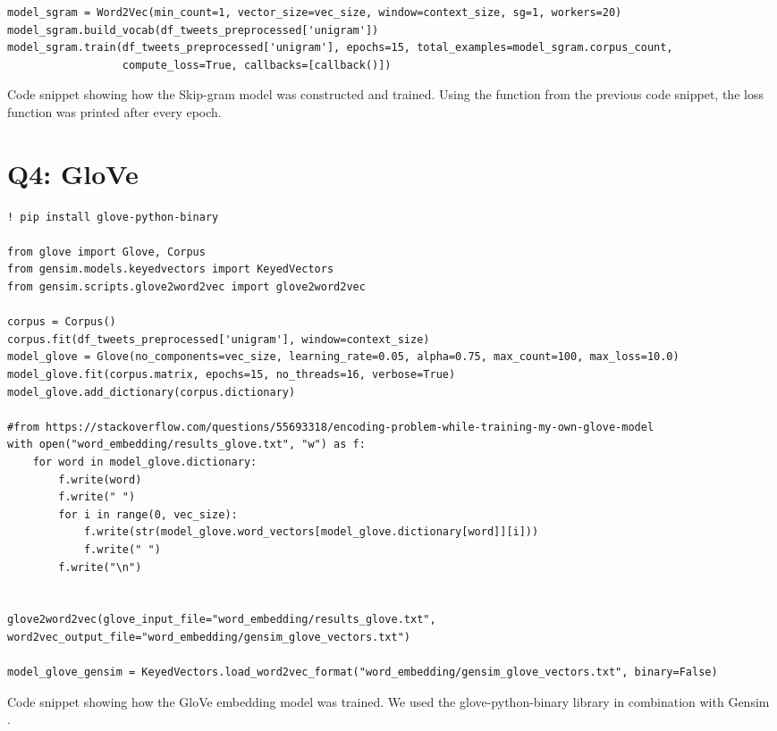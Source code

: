 \begin{listing*}
\begin{verbatim}
model_sgram = Word2Vec(min_count=1, vector_size=vec_size, window=context_size, sg=1, workers=20)
model_sgram.build_vocab(df_tweets_preprocessed['unigram'])
model_sgram.train(df_tweets_preprocessed['unigram'], epochs=15, total_examples=model_sgram.corpus_count,
                  compute_loss=True, callbacks=[callback()])
\end{verbatim}
\caption{Code snippet showing how the Skip-gram model was constructed and trained. Using the function from the previous code snippet, the loss function was printed after every epoch.}
\label{listing:p2-sgram}
\end{listing*}


\section*{Q4: GloVe}
\begin{listing*}
\begin{verbatim}
! pip install glove-python-binary

from glove import Glove, Corpus
from gensim.models.keyedvectors import KeyedVectors
from gensim.scripts.glove2word2vec import glove2word2vec

corpus = Corpus() 
corpus.fit(df_tweets_preprocessed['unigram'], window=context_size)
model_glove = Glove(no_components=vec_size, learning_rate=0.05, alpha=0.75, max_count=100, max_loss=10.0)
model_glove.fit(corpus.matrix, epochs=15, no_threads=16, verbose=True)
model_glove.add_dictionary(corpus.dictionary)

#from https://stackoverflow.com/questions/55693318/encoding-problem-while-training-my-own-glove-model
with open("word_embedding/results_glove.txt", "w") as f:
    for word in model_glove.dictionary:
        f.write(word)
        f.write(" ")
        for i in range(0, vec_size):
            f.write(str(model_glove.word_vectors[model_glove.dictionary[word]][i]))
            f.write(" ")
        f.write("\n")


glove2word2vec(glove_input_file="word_embedding/results_glove.txt", word2vec_output_file="word_embedding/gensim_glove_vectors.txt")    

model_glove_gensim = KeyedVectors.load_word2vec_format("word_embedding/gensim_glove_vectors.txt", binary=False)
\end{verbatim}
\caption{Code snippet showing how the GloVe embedding model was trained. We used the glove-python-binary library \cite{glovegit} in combination with Gensim \cite{gensim}.}
\label{listing:p2-glove}
\end{listing*}

